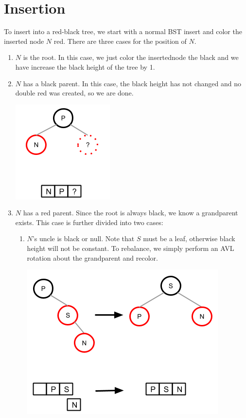 \documentclass[12pt]{article}
\begin{document}
\section*{Insertion}
To insert into a red-black tree, we start with a normal BST insert and color the inserted node $N$ red. There are three cases for the position of $N$.
\begin{enumerate}
  \item $N$ is the root. In this case, we just color the insertednode the black and we have increase the black height of the tree by 1.
  \item $N$ has a black parent. In this case, the black height has not changed and no double red was created, so we are done.
  \begin{center}
    \includegraphics[scale=0.75]{pics/red_black_tree/ins_bpar}
  \end{center}
  \item $N$ has a red parent. Since the root is always black, we know a grandparent exists. This case is further divided into two cases:
  \begin{enumerate}
    \item $N$'s uncle is black or null. Note that $S$ must be a leaf, otherwise black height will not be constant. To rebalance, we simply perform an AVL rotation about the grandparent and recolor.
    \begin{center}
      \includegraphics[scale=0.75]{pics/red_black_tree/ins_rpar_bunc_rr}

\end{center}
\end{enumerate}
\end{enumerate}
\end{document}
